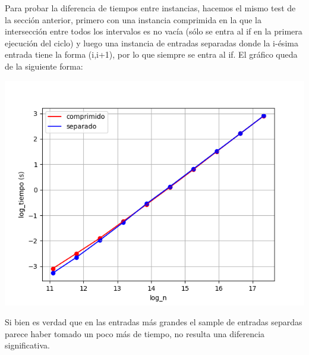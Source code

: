 Para probar la diferencia de tiempos entre instancias, hacemos el mismo test de la sección anterior, primero con una instancia comprimida en la que la intersección entre todos los intervalos es no vacía (sólo se entra al if en la primera ejecución del ciclo) y luego una instancia de entradas separadas donde la i-ésima entrada tiene la forma (i,i+1), por lo que siempre se entra al if. El gráfico queda de la siguiente forma:

\includegraphics{files/src/.media/Grafico_comprimido_vs_separado.png}

Si bien es verdad que en las entradas más grandes el sample de entradas separdas parece haber tomado un poco más de tiempo, no resulta una diferencia significativa.